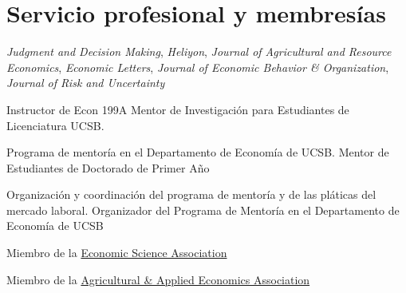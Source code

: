 
\section{Servicio profesional y membresías}

{\textit{Judgment and Decision Making}, \textit{Heliyon}, \textit{Journal of Agricultural and Resource Economics},  \textit{Economic Letters}, \textit{Journal of Economic Behavior \& Organization}, \textit{Journal of Risk and Uncertainty}}
{}
{}
{}
{}

{Instructor de Econ 199A}
{Mentor de Investigación para Estudiantes de Licenciatura}
{}
{UCSB.}
{}

{Programa de mentoría en el Departamento de Economía de UCSB.}
{Mentor de Estudiantes de Doctorado de Primer Año}
{}
{}{}

{Organización y coordinación del programa de mentoría y de las pláticas del mercado laboral.}
{Organizador del Programa de Mentoría en el Departamento de Economía de UCSB}{}
{}{}

{}
{Miembro de la \href{https://www.economicscience.org/}{Economic Science Association}}
{}
{}{}

{}
{Miembro de la \href{https://www.aaea.org/}{Agricultural \& Applied Economics Association}}
{}
{}{}





